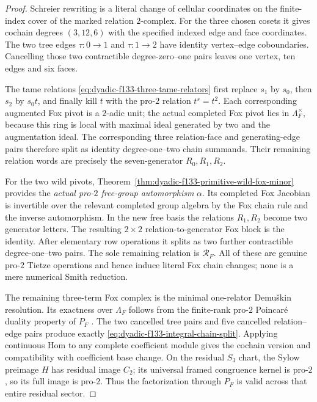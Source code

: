 \documentclass[11pt]{article}
\theoremstyle{definition}
\begin{document}
\begin{proof}
Schreier
rewriting is a
literal change
of cellular
coordinates
on the
finite-index
cover of the
marked relation
$2$-complex.
For the three
chosen cosets
it gives
cochain degrees
$(3,12,6)$
with the
specified
indexed edge
and face
coordinates.
The two
tree edges
$\tau:0\to1$
and $\tau:1\to2$
have identity
vertex--edge
coboundaries.
Cancelling those
two contractible
degree-zero--one
pairs leaves
one vertex,
ten edges and
six faces.

The tame
relations
\eqref{eq:dyadic-f133-three-tame-relators}
first replace
$s_1$ by $s_0$,
then $s_2$ by
$s_0t$,
and finally kill
$t$ with the
pro-$2$ relation
$t^s=t^2$.
Each corresponding
augmented Fox
pivot is a
$2$-adic unit;
the actual
completed
Fox pivot
lies in
$\Lambda_F^\times$,
because this
ring is local
with maximal
ideal generated
by two and the
augmentation
ideal.
The corresponding
three relation-face
and generating-edge
pairs therefore
split as identity
degree-one--two
chain summands.
Their remaining
relation words
are precisely
the seven-generator
$R_0,R_1,R_2$.

For the two
wild pivots,
Theorem~\ref{thm:dyadic-f133-primitive-wild-fox-minor}
provides the
\emph{actual pro-$2$
free-group
automorphism}
$\alpha$.
Its completed
Fox Jacobian is
invertible over
the relevant
completed group
algebra by the
Fox chain rule
and the
inverse automorphism.
In the new
free basis the
relations $R_1,R_2$
become two
generator letters.
The resulting
$2\times2$
relation-to-generator
Fox block is
the identity.
After elementary
row operations
it splits as
two further
contractible
degree-one--two
pairs.
The sole
remaining
relation is
$\mathscr R_F$.
All of these
are genuine
pro-$2$ Tietze
operations and
hence induce
literal Fox
chain changes;
none is a
mere numerical
Smith reduction.

The remaining
three-term Fox
complex is the
minimal one-relator
Demu\v{s}kin
resolution.
Its exactness
over $\Lambda_F$
follows from
the finite-rank
pro-$2$
Poincar\'e
duality property
of $P_F$
\cite{LabuteClassification,NSW}.
The two cancelled
tree pairs and
five cancelled
relation--edge
pairs produce
exactly
\eqref{eq:dyadic-f133-integral-chain-split}.
Applying
continuous Hom
to any complete
coefficient
module gives
the cochain
version and
compatibility
with coefficient
base change.
On the residual
$S_3$ chart,
the Sylow
preimage $H$
has residual
image $C_2$;
its universal
framed
congruence kernel
is pro-$2$,
so its full
image is pro-$2$.
Thus the
factorization
through $P_F$
is valid across
that entire
residual sector.


\end{proof}
\end{document}

